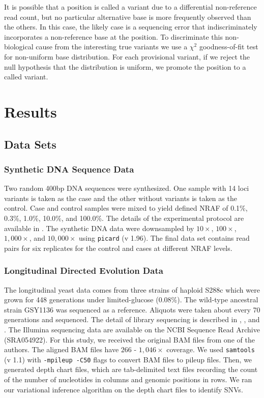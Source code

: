 \documentclass{bmcart}
\begin{document}
It is possible that a position is called a variant due to a differential non-reference read count, but no particular alternative base is more frequently observed than the others.
In this case, the likely case is a sequencing error that indiscriminately incorporates a non-reference base at the position.
To discriminate this non-biological cause from the interesting true variants we use a $\chi^2$ goodness-of-fit test for non-uniform base distribution\cite{efron2010large, he2015rvd2}.
For each provisional variant, if we reject the null hypothesis that the distribution is uniform, we promote the position to a called variant.


\section*{Results}

\subsection*{Data Sets}

\subsubsection*{Synthetic DNA Sequence Data}

Two random 400bp DNA sequences were synthesized. One sample with 14 loci variants is taken as the case and the other without variants is taken as the control.
Case and control samples were mixed to yield defined NRAF of 0.1\%, 0.3\%, 1.0\%, 10.0\%, and 100.0\%.
The details of the experimental protocol are available in \cite{flaherty2011ultrasensitive}.
The synthetic DNA data were downsampled by $10\times$, $100\times$, $1,000\times$, and $10,000\times$ using \texttt{picard} (v 1.96).
The final data set contains read pairs for six replicates for the control and cases at different NRAF levels.

\subsubsection*{Longitudinal Directed Evolution Data}

The longitudinal yeast data comes from three strains of haploid S288c which were grown for 448 generations under limited-glucose (0.08\%).
The wild-type ancestral strain GSY1136 was sequenced as a reference.
Aliquots were taken about every 70 generations and sequenced.
The detail of library sequencing is described in \cite{kvitek2013whole}, \cite{bansal2010statistical}, and \cite{kao2008molecular}.
The Illumina sequencing data are available on the NCBI Sequence Read Archive (SRA054922)\cite{kvitek2013whole}.
For this study, we received the original BAM files from one of the authors.
The aligned BAM files have $266$ - $1,046\times$ coverage.
We used \texttt{samtools} (v 1.1) with \texttt{-mpileup -C50} flags to convert BAM files to pileup files.
Then, we generated depth chart files, which are tab-delimited text files recording the count of the number of nucleotides in columns and genomic positions in rows.
We ran our variational inference algorithm on the depth chart files to identify SNVs.
\end{document}
